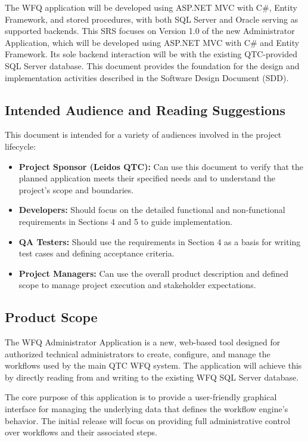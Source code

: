 \documentclass[12pt]{article}
\begin{document}
The WFQ application will be developed using ASP.NET MVC with C\#, Entity Framework, and
stored procedures, with both SQL Server and Oracle serving as supported backends. This SRS
focuses on Version 1.0 of the new Administrator Application, which will be developed using
ASP.NET MVC with C\# and Entity Framework. Its sole backend interaction will be with the
existing QTC-provided SQL Server database. This document provides the foundation for the
design and implementation activities described in the Software Design Document (SDD).

\subsection{Intended Audience and Reading Suggestions}
This document is intended for a variety of audiences involved in the project lifecycle:

\begin{itemize}
    \item \textbf{Project Sponsor (Leidos QTC):} Can use this document to verify that the
    planned application meets their specified needs and to understand the project's scope and
    boundaries.
    \item \textbf{Developers:} Should focus on the detailed functional and non-functional
    requirements in Sections 4 and 5 to guide implementation.
    \item \textbf{QA Testers:} Should use the requirements in Section 4 as a basis for writing
    test cases and defining acceptance criteria.
    \item \textbf{Project Managers:} Can use the overall product description and defined scope
    to manage project execution and stakeholder expectations.
\end{itemize}

\subsection{Product Scope}
The WFQ Administrator Application is a new, web-based tool designed for authorized technical
administrators to create, configure, and manage the workflows used by the main QTC WFQ
system. The application will achieve this by directly reading from and writing to the existing
WFQ SQL Server database.

The core purpose of this application is to provide a user-friendly graphical interface for
managing the underlying data that defines the workflow engine's behavior. The initial release
will focus on providing full administrative control over workflows and their associated steps.
\end{document}
